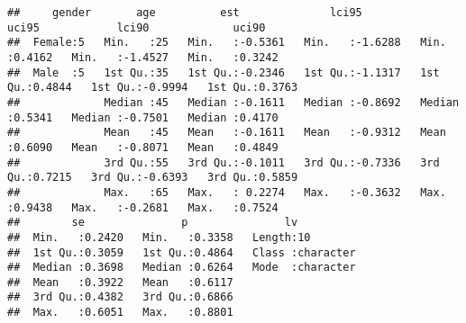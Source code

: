 \documentclass[
]{article}
\begin{document}
\begin{verbatim}
##     gender       age          est              lci95             uci95            lci90             uci90       
##  Female:5   Min.   :25   Min.   :-0.5361   Min.   :-1.6288   Min.   :0.4162   Min.   :-1.4527   Min.   :0.3242  
##  Male  :5   1st Qu.:35   1st Qu.:-0.2346   1st Qu.:-1.1317   1st Qu.:0.4844   1st Qu.:-0.9994   1st Qu.:0.3763  
##             Median :45   Median :-0.1611   Median :-0.8692   Median :0.5341   Median :-0.7501   Median :0.4170  
##             Mean   :45   Mean   :-0.1611   Mean   :-0.9312   Mean   :0.6090   Mean   :-0.8071   Mean   :0.4849  
##             3rd Qu.:55   3rd Qu.:-0.1011   3rd Qu.:-0.7336   3rd Qu.:0.7215   3rd Qu.:-0.6393   3rd Qu.:0.5859  
##             Max.   :65   Max.   : 0.2274   Max.   :-0.3632   Max.   :0.9438   Max.   :-0.2681   Max.   :0.7524  
##        se               p               lv           
##  Min.   :0.2420   Min.   :0.3358   Length:10         
##  1st Qu.:0.3059   1st Qu.:0.4864   Class :character  
##  Median :0.3698   Median :0.6264   Mode  :character  
##  Mean   :0.3922   Mean   :0.6117                     
##  3rd Qu.:0.4382   3rd Qu.:0.6866                     
##  Max.   :0.6051   Max.   :0.8801
\end{verbatim}
\end{document}
